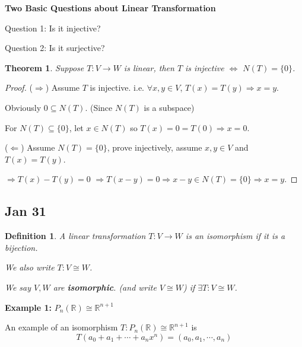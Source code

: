 \documentclass[12pt]{article}
\theoremstyle{plain}
\newtheorem{theorem}{Theorem}[subsection]
\newtheorem{definition}{Definition}[subsection]
\newcommand{\mR}{{\mathbb{R}}}
\begin{document}
	{\color{brown}
	\textbf{Two Basic Questions about Linear Transformation}
	
	Question 1: Is it injective? 

	Question 2: Is it surjective? 
	}
	\begin{theorem}
		Suppose $T : V\to W$ is linear, then $T$ is injective $\iff$ 
		$N(T) = \{0\}$.  
	\end{theorem}
	\begin{proof}
		($\Rightarrow$) Assume $T$ is injective. i.e. $\forall x,y \in V$, 
		$T(x) = T(y) \Rightarrow x=y$. 

		Obviously $0 \subseteq N(T)$. (Since $N(T)$ is a subspace)
		
		For $N(T) \subseteq \{0\}$, let $x \in N(T)$ so $T(x) = 0 = T(0)
		\Rightarrow x=0$. 


		($\Leftarrow$) Assume $N(T) = \{0\}$, prove injectively, 
		assume $x, y \in V$ and $T(x) = T(y)$.

		$\Rightarrow T(x) - T(y) = 0$ $\Rightarrow T(x-y) = 0 \Rightarrow
		x-y \in N(T) = \{0\} \Rightarrow x=y$. 
	\end{proof}

	
\newpage
	\subsection{Jan 31}
	\begin{definition}
		A linear transformation $T : V\to W$ is an isomorphism if it is a 
		bijection. 

		We also write $T:V\cong W$. 

		We say $V, W$ are \textbf{isomorphic}. (and write $V\cong W$) if 
		$\exists T: V\cong W$. 
	\end{definition}

	{\color{Brown}
		\textbf{Example 1: }
		$P_n(\mR) \cong \mR^{n+1}$ 

		An example of an isomorphism 
		$T:P_n(\mR) \cong \mR^{n+1}$ is 
		\[
			T(a_0+a_1+\cdots+a_nx^n) = (a_0, a_1, \cdots, a_n)
		\]
	}
\end{document}
